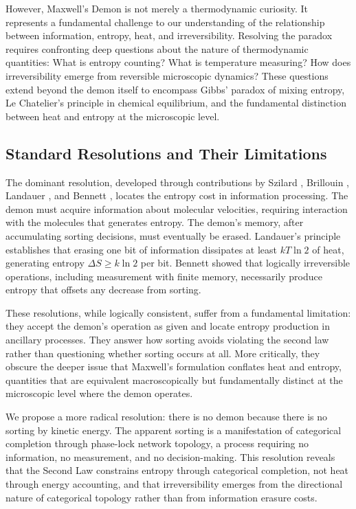 \documentclass[12pt,a4paper]{article}
\theoremstyle{definition}
\theoremstyle{remark}
\begin{document}
However, Maxwell's Demon is not merely a thermodynamic curiosity. It represents a fundamental challenge to our understanding of the relationship between information, entropy, heat, and irreversibility. Resolving the paradox requires confronting deep questions about the nature of thermodynamic quantities: What is entropy counting? What is temperature measuring? How does irreversibility emerge from reversible microscopic dynamics? These questions extend beyond the demon itself to encompass Gibbs' paradox of mixing entropy, Le Chatelier's principle in chemical equilibrium, and the fundamental distinction between heat and entropy at the microscopic level.

\subsection{Standard Resolutions and Their Limitations}

The dominant resolution, developed through contributions by Szilard \citep{szilard1929entropieverminderung}, Brillouin \citep{brillouin1951maxwells}, Landauer \citep{landauer1961irreversibility}, and Bennett \citep{bennett1982thermodynamics}, locates the entropy cost in information processing. The demon must acquire information about molecular velocities, requiring interaction with the molecules that generates entropy. The demon's memory, after accumulating sorting decisions, must eventually be erased. Landauer's principle establishes that erasing one bit of information dissipates at least $kT \ln 2$ of heat, generating entropy $\Delta S \geq k \ln 2$ per bit. Bennett showed that logically irreversible operations, including measurement with finite memory, necessarily produce entropy that offsets any decrease from sorting.

These resolutions, while logically consistent, suffer from a fundamental limitation: they accept the demon's operation as given and locate entropy production in ancillary processes. They answer how sorting avoids violating the second law rather than questioning whether sorting occurs at all. More critically, they obscure the deeper issue that Maxwell's formulation conflates heat and entropy, quantities that are equivalent macroscopically but fundamentally distinct at the microscopic level where the demon operates.

We propose a more radical resolution: there is no demon because there is no sorting by kinetic energy. The apparent sorting is a manifestation of categorical completion through phase-lock network topology, a process requiring no information, no measurement, and no decision-making. This resolution reveals that the Second Law constrains entropy through categorical completion, not heat through energy accounting, and that irreversibility emerges from the directional nature of categorical topology rather than from information erasure costs.
\end{document}
